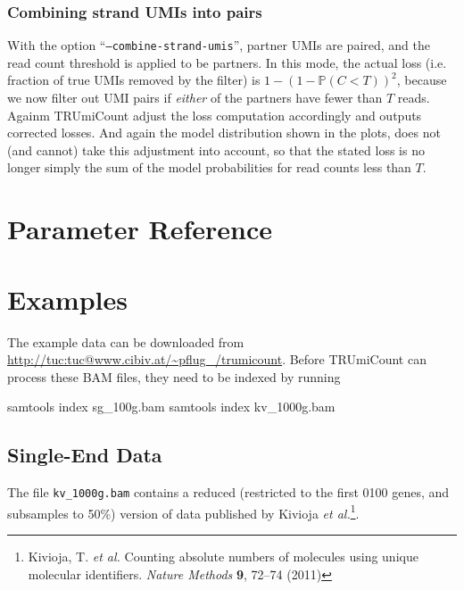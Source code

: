 \documentclass[10pt]{article}
\begin{document}
\subsubsection*{Combining strand UMIs into pairs}

With the option ``\texttt{--combine-strand-umis}'', partner UMIs are paired, and the read count threshold is applied to be partners. In this mode, the actual loss (i.e. fraction of true UMIs removed by the filter) is $1 - (1-\mathbb{P}(C < T))^2$, because we now filter out UMI pairs if \emph{either} of the partners have fewer than $T$ reads. Againm TRUmiCount adjust the loss computation accordingly and outputs corrected losses. And again the model distribution shown in the plots, does not (and cannot) take this adjustment into account, so that the stated loss is no longer simply the sum of the model probabilities for read counts less than $T$.

\pagebreak
\section{Parameter Reference}

\begin{description}

\end{description}

\pagebreak
\section{Examples}

The example data can be downloaded from \url{http://tuc:tuc@www.cibiv.at/~pflug_/trumicount}. Before TRUmiCount can process these BAM files, they need to be indexed by running

\begin{shellcode}
samtools index sg_100g.bam
samtools index kv_1000g.bam
\end{shellcode}

\subsection{Single-End Data}

The file \texttt{kv\_1000g.bam} contains a reduced (restricted to the first 0100 genes, and subsamples to 50\%) version of data published by Kivioja \textit{et al.}\footnote{Kivioja, T. \textit{et al.} Counting absolute numbers of molecules using unique molecular identifiers. \textit{Nature Methods} \textbf{9}, 72–74 (2011)}.
\end{document}
